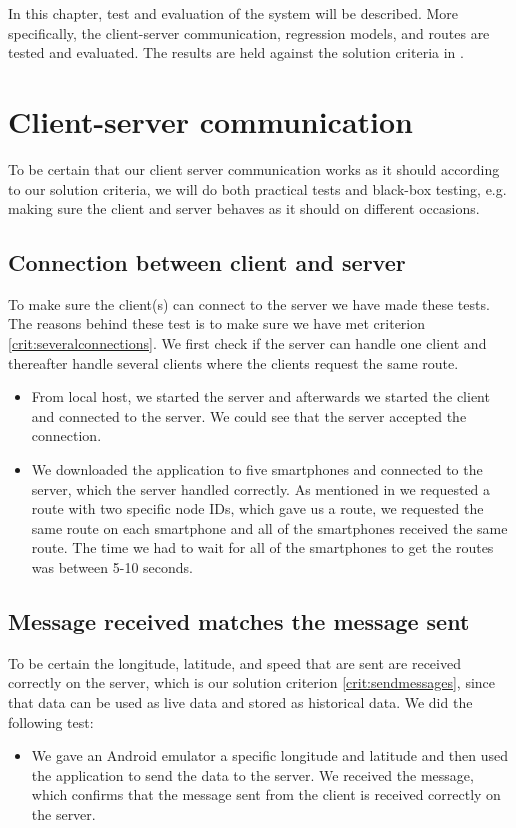 In this chapter, test and evaluation of the system will be described. More specifically, the client-server communication, regression models, and routes are tested and evaluated. The results are held against the solution criteria in .

\section{Client-server communication}
To be certain that our client server communication works as it should according to our solution criteria, we will do both practical tests and black-box testing, e.g. making sure the client and server behaves as it should on different occasions.

\subsection{Connection between client and server}
To make sure the client(s) can connect to the server we have made these tests. The reasons behind these test is to make sure we have met criterion \ref{crit:severalconnections}. We first check if the server can handle one client and thereafter handle several clients where the clients request the same route. 
\begin{itemize}
	\item From local host, we started the server and afterwards we started the client and connected to the server. We could see that the server accepted the connection.
	\item We downloaded the application to five smartphones and connected to the server, which the server handled correctly. As mentioned in  we requested a route with two specific node IDs, which gave us a route, we requested the same route on each smartphone and all of the smartphones received the same route. The time we had to wait for all of the smartphones to get the routes was between 5-10 seconds.
\end{itemize}

\subsection{Message received matches the message sent}
To be certain the longitude, latitude, and speed that are sent are received correctly on the server, which is our solution criterion \ref{crit:sendmessages}, since that data can be used as live data and stored as historical data. We did the following test:
\begin{itemize}
	\item We gave an Android emulator a specific longitude and latitude and then used the application to send the data to the server. We received the message, which confirms that the message sent from the client is received correctly on the server.
\end{itemize}

